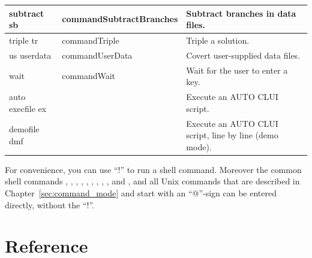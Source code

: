 \documentclass[12pt]{report}
\begin{document}
\begin{longtable}{|p{1.1in}|l|p{2.5in}|}
subtract sb & commandSubtractBranches & Subtract branches in data files.\\ \hline
triple tr & commandTriple & Triple a solution.\\ \hline 
us userdata & commandUserData & Covert user-supplied data files.\\ \hline 
wait & commandWait & Wait for the user to enter a key.\\ \hline 
auto execfile ex & & Execute an AUTO CLUI script.\\ \hline
demofile dmf & & Execute an AUTO CLUI script, line by line (demo
mode). \\ \hline
\end{longtable}
For convenience, you can use ``!'' to run a shell command. Moreover
the common shell commands , ,
, ,
, , , ,
, and , and all \AUTO Unix commands that are described
in Chapter~\ref{sec:command_mode} and start with an ``@''-sign can be
entered directly, without the ``!''.
\pagebreak
\section{ Reference }  \label{sec:clui reference}
\end{document}
